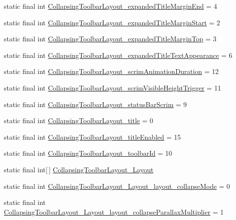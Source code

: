 \begin{CompactItemize}
static final int \hyperlink{classandroid_1_1support_1_1v4_1_1_r_1_1styleable_51a799757acf71b646e197b66d32c630}{CollapsingToolbarLayout\_\-expandedTitleMarginEnd} = 4
\item 
static final int \hyperlink{classandroid_1_1support_1_1v4_1_1_r_1_1styleable_84d535c1e152dbfcb33c3dda89373800}{CollapsingToolbarLayout\_\-expandedTitleMarginStart} = 2
\item 
static final int \hyperlink{classandroid_1_1support_1_1v4_1_1_r_1_1styleable_ed514040b0b3e40f9813597f18ec5fa8}{CollapsingToolbarLayout\_\-expandedTitleMarginTop} = 3
\item 
static final int \hyperlink{classandroid_1_1support_1_1v4_1_1_r_1_1styleable_28094fe9aadbf7fa99afd24d0f68a70e}{CollapsingToolbarLayout\_\-expandedTitleTextAppearance} = 6
\item 
static final int \hyperlink{classandroid_1_1support_1_1v4_1_1_r_1_1styleable_86f1d13a3a764019f8ea6f2166dabaac}{CollapsingToolbarLayout\_\-scrimAnimationDuration} = 12
\item 
static final int \hyperlink{classandroid_1_1support_1_1v4_1_1_r_1_1styleable_ef297f6084b2419ca1056fa3c53bc36f}{CollapsingToolbarLayout\_\-scrimVisibleHeightTrigger} = 11
\item 
static final int \hyperlink{classandroid_1_1support_1_1v4_1_1_r_1_1styleable_6a591832849ef0da0ef6a52fc4f0b623}{CollapsingToolbarLayout\_\-statusBarScrim} = 9
\item 
static final int \hyperlink{classandroid_1_1support_1_1v4_1_1_r_1_1styleable_496e34c231a07ed97f239394f3eda86e}{CollapsingToolbarLayout\_\-title} = 0
\item 
static final int \hyperlink{classandroid_1_1support_1_1v4_1_1_r_1_1styleable_37213d22bd11ccc3f3d3c343c9828a91}{CollapsingToolbarLayout\_\-titleEnabled} = 15
\item 
static final int \hyperlink{classandroid_1_1support_1_1v4_1_1_r_1_1styleable_9f99f544b90e15c7d36234462470e3f7}{CollapsingToolbarLayout\_\-toolbarId} = 10
\item 
static final int\mbox{[}$\,$\mbox{]} \hyperlink{classandroid_1_1support_1_1v4_1_1_r_1_1styleable_6906c73a21feed9a1c451f787d6f3059}{CollapsingToolbarLayout\_\-Layout}
\item 
static final int \hyperlink{classandroid_1_1support_1_1v4_1_1_r_1_1styleable_0a4d753a9146e42fa452216511bb60bd}{CollapsingToolbarLayout\_\-Layout\_\-layout\_\-collapseMode} = 0
\item 
static final int \hyperlink{classandroid_1_1support_1_1v4_1_1_r_1_1styleable_d364fcfe501be0099ffef1f05abd61c9}{CollapsingToolbarLayout\_\-Layout\_\-layout\_\-collapseParallaxMultiplier} = 1

\end{CompactItemize}
